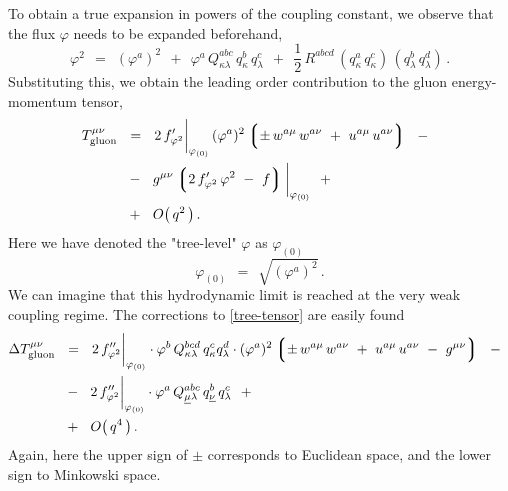 \documentclass[epsfig,12pt]{article}
\def\beq{\begin{equation}}
\def\eeq{\end{equation}}
\newcommand{\lgr}{\left\lgroup}
\newcommand{\rgr}{\right\rgroup}
\begin{document}
	To obtain a true expansion in powers of the coupling constant, we observe that the flux $ \varphi $
	needs to be expanded beforehand,
\beq
	\varphi^2    ~~=~~    (\varphi^a)^2  ~~+~~ \varphi^a\, Q^{abc}_{\kappa\lambda}\, q^b_\kappa\, q^c_\lambda
		     ~~+~~ \frac 1 2\, R^{abcd}\, (q^a_\kappa\, q^c_\kappa)\, (q^b_\lambda\, q^d_\lambda)\,.
\eeq
	Substituting this, we obtain the leading order contribution to the gluon energy-momentum tensor,
\begin{align}
%
\notag
	T_\text{gluon}^{\mu\nu}    & ~~=~~    2\, f^\prime_{\varphi^2} \bigg|_{\varphi_{(0)}}\,
					      (\varphi^a)^2 \lgr \pm\, w^{a\mu}\, w^{a\nu}  ~+~  u^{a\mu}\, u^{a\nu} \rgr
				     ~~-~~
	\\
%
\label{tree-tensor}
				   & ~~-~~    g^{\mu\nu} \lgr 2\, f^\prime_{\varphi^2}\, \varphi^2 ~-~ f \rgr \bigg|_{\varphi_{(0)}}
				     ~~+~~
	\\
%
\notag
				   & ~~+~~    O\big(\, q^2 \,\big)\,.
\end{align}
	Here we have denoted the "tree-level" $ \varphi $ as $ \varphi_{(0)} $\,
\beq
	\varphi_{(0)}    ~~=~~    \sqrt{ (\varphi^a)^2 }\,.
\eeq
	We can imagine that this hydrodynamic limit is reached at the very weak coupling regime.
	The corrections to \eqref{tree-tensor} are easily found
\begin{align}
%
\notag
	\Delta T_\text{gluon}^{\mu\nu}    & ~~=~~    2\, f''_{\varphi^2}\bigg|_{\varphi_{(0)}} \cdot
						     \varphi^b\, Q^{bcd}_{\kappa\lambda}\, q^c_\kappa q^d_\lambda \cdot
						     (\varphi^a)^2
						     \lgr \pm\, w^{a\mu}\, w^{a\nu} ~+~ u^{a\mu}\, u^{a\nu} ~-~ g^{\mu\nu} \rgr
					    ~~-~~
	\\
%
\label{tensor-corr}
					  & ~~-~~    2\, f''_{\varphi^2}\bigg|_{\varphi_{(0)}} \cdot
						     \varphi^a\, Q^{abc}_{\underline{\mu}\lambda}\, q^b_{\underline \nu}\, q^c_\lambda
					    ~~+~~
	\\
%
					  & ~~+~~    O\big(\, q^4 \,\big)\,.
\notag
\end{align}
	Again, here the upper sign of $ \pm $ corresponds to Euclidean space, and the lower sign to Minkowski space.




\end{document}
